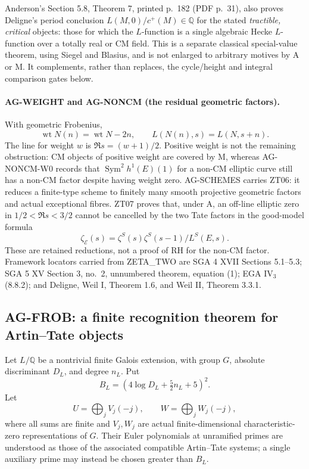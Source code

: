 \documentclass[11pt,a4paper]{article}
\begin{document}
Anderson's Section 5.8, Theorem 7, printed p.~182 (PDF p.~31), also
proves Deligne's period conclusion
$L(M,0)/c^+(M)\in\mathbb Q$ for the stated \emph{tractible, critical}
objects: those for which the $L$-function is a single algebraic Hecke
$L$-function over a totally real or CM field. This is a separate
classical special-value theorem, using Siegel and Blasius, and is not
enlarged to arbitrary motives by A or M. It complements, rather than
replaces, the cycle/height and integral comparison gates below.

\paragraph{AG-WEIGHT and AG-NONCM (the residual geometric factors).}
With geometric Frobenius,
\[
 \operatorname{wt}N(n)=\operatorname{wt}N-2n,
 \qquad L(N(n),s)=L(N,s+n).
\]
The line for weight $w$ is $\Re s=(w+1)/2$. Positive weight is not the
remaining obstruction: CM objects of positive weight are covered by M,
whereas AG-NONCM-W0 records that $\operatorname{Sym}^2h^1(E)(1)$ for a non-CM elliptic curve still
has a non-CM factor despite having weight zero. AG-SCHEMES carries ZT06: it reduces a finite-type
scheme to finitely many smooth projective geometric factors and actual
exceptional fibres. ZT07 proves that, under A, an off-line elliptic zero
in $1/2<\Re s<3/2$ cannot be cancelled by the two Tate factors in the
good-model formula
\[
 \zeta_{\mathcal E}(s)
   =\zeta^S(s)\zeta^S(s-1)/L^S(E,s).
\]
These are retained reductions, not a proof of RH for the non-CM factor.
Framework locators carried from ZETA\_TWO are SGA 4 XVII Sections 5.1--5.3;
SGA 5 XV Section 3, no.~2, unnumbered theorem, equation (1);
EGA IV$_3$ (8.8.2); and Deligne, Weil I, Theorem 1.6, and Weil II,
Theorem 3.3.1.

\subsection{AG-FROB: a finite recognition theorem for Artin--Tate objects}
\label{ag:frob}

Let $L/\mathbb Q$ be a nontrivial finite Galois extension, with group $G$,
absolute discriminant $D_L$, and degree $n_L$. Put
\[
 B_L=(4\log D_L+\tfrac52 n_L+5)^2.
\]
Let
\[
 U=\bigoplus_j V_j(-j),\qquad W=\bigoplus_j W_j(-j),
\]
where all sums are finite and $V_j,W_j$ are actual finite-dimensional
characteristic-zero representations of $G$. Their Euler polynomials at
unramified primes are understood as those of the associated compatible
Artin--Tate systems; a single auxiliary prime may instead be chosen greater
than $B_L$.
\end{document}
